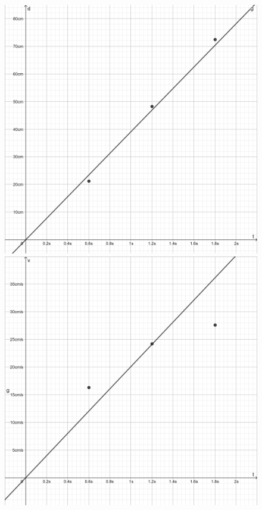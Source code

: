 \documentclass[12pt]{article}
\begin{document}
\begin{enumerate}
\begin{figure}[H]
\begin{minipage}{0.4\textwidth}
            \includegraphics[scale=1.25]{LabReportImg/5TB-TangentLine.png}
        \end{minipage}
        \begin{minipage}{0.4\textwidth}
            \centering
            \includegraphics[scale=1.25]{LabReportImg/3TB-TangentLine.png}

\end{minipage}
\end{figure}
\end{enumerate}
\end{document}
